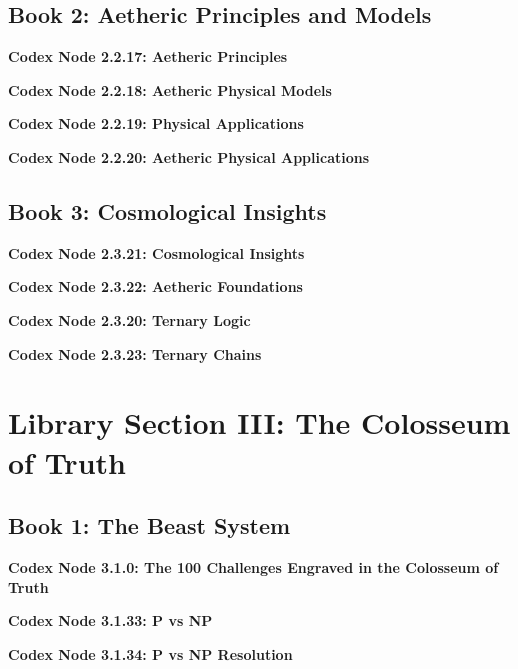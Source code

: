 \documentclass[a4paper,12pt]{book}
\newcommand{\codexnode}[5]{%
  \par\vspace{0.5em}%
  \noindent\textbf{Codex Node #1.#2.#3: #5}\label{#4}%
  \par\vspace{0.5em}%
}
\begin{document}
\subsection{Book 2: Aetheric Principles and Models}
\codexnode{2}{2}{17}{chapter1_aetheric_principles}{Aetheric Principles}


\codexnode{2}{2}{18}{chapter2_aetheric_physical_models}{Aetheric Physical Models}


\codexnode{2}{2}{19}{chapter2_physical_applications}{Physical Applications}


\codexnode{2}{2}{20}{chapter2_aetheric_physical_applications}{Aetheric Physical Applications}


\subsection{Book 3: Cosmological Insights}
\codexnode{2}{3}{21}{section2/book3/chapter3_cosmological_insights}{Cosmological Insights}
\codexnode{2}{3}{22}{section2/book3/chapter3_aetheric_foundations}{Aetheric Foundations}
\codexnode{2}{3}{20}{section2/book3/codex_ternary_logic}{Ternary Logic}
\codexnode{2}{3}{23}{section2/book3/codex_ternary_chains}{Ternary Chains}


\section{Library Section III: The Colosseum of Truth}

\subsection{Book 1: The Beast System}
\codexnode{3}{1}{0}{codex_100_challenges}{The 100 Challenges Engraved in the Colosseum of Truth}


\codexnode{3}{1}{33}{section3/book1/codex_p_vs_np}{P vs NP}


\codexnode{3}{1}{34}{section3/book1/chapter1_p_vs_np_resolution}{P vs NP Resolution}

\end{document}
